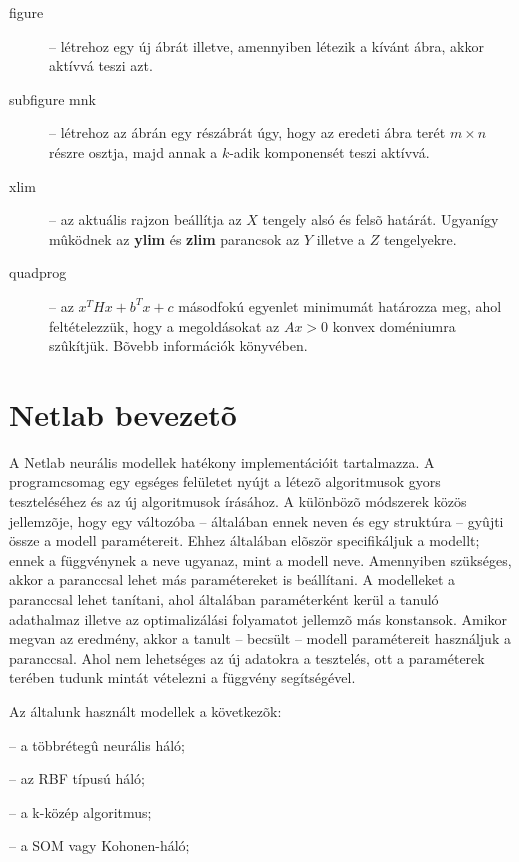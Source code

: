 {\begin{description}
    \item[figure] -- létrehoz egy új ábrát illetve, amennyiben létezik a kívánt ábra, akkor aktívvá teszi azt.
    \item[subfigure mnk] -- létrehoz az ábrán egy részábrát úgy, hogy az eredeti ábra terét $m\times n$ részre osztja, majd annak a $k$-adik komponensét teszi aktívvá.
    \item[xlim] -- az aktuális rajzon beállítja az $X$ tengely alsó és felsõ határát. Ugyanígy mûködnek az {\bf ylim} és {\bf zlim} parancsok az $Y$ illetve a $Z$ tengelyekre.
    \item[quadprog] -- az $x^THx + b^Tx + c$ másodfokú egyenlet minimumát határozza meg, ahol feltételezzük, hogy a megoldásokat az $A x>0$ konvex doméniumra szûkítjük. Bõvebb információk  könyvében.
\end{description}
}

\section{Netlab bevezetõ}\label{sec:MAT:Netlab}

A {Netlab} neurális modellek hatékony implementációit
tartalmazza. A programcsomag egy egséges felületet nyújt a létezõ
algoritmusok gyors teszteléséhez és az új algoritmusok írásához.
A különbözõ módszerek közös jellemzõje, hogy egy változóba --
általában ennek neven  és egy struktúra -- gyûjti össze
a modell paramétereit. Ehhez általában elõször specifikáljuk a
modellt; ennek a függvénynek a neve ugyanaz, mint a modell neve.
Amennyiben szükséges, akkor a  paranccsal
lehet más paramétereket is beállítani. A modelleket a
 paranccsal lehet tanítani, ahol általában
paraméterként kerül a tanuló adathalmaz illetve az optimalizálási
folyamatot jellemzõ más konstansok. Amikor megvan az eredmény,
akkor a tanult -- becsült -- modell paramétereit használjuk a
 paranccsal. Ahol nem lehetséges az új
adatokra a tesztelés, ott a paraméterek terében tudunk mintát
vételezni a  függvény segítségével.

Az általunk használt modellek a következõk:
\begin{description}
    \setlength{\itemsep}{0.04mm}
    \item[mlp] -- a többrétegû neurális háló;
    \item[rbf] -- az RBF típusú háló;
    \item[kmeans] -- a k-közép algoritmus;
    \item[som] -- a SOM vagy Kohonen-háló;
\end{description}

